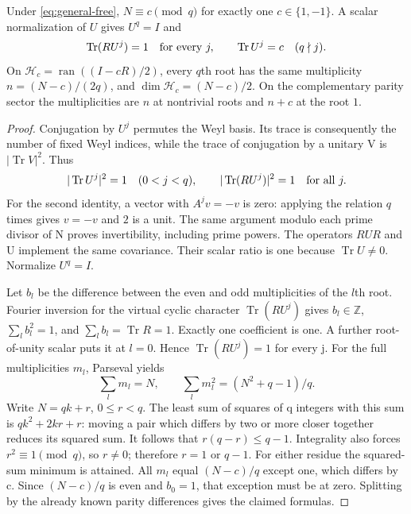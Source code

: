 \begin{theorem}\label{thm:uniform-sector}
Under \eqref{eq:general-free}, $N\equiv c\pmod q$ for exactly one
$c\in\{1,-1\}$. A scalar normalization of $U$ gives $U^q=I$ and
\[
 \operatorname{Tr}(RU^j)=1\quad\hbox{for every }j,\qquad
 \operatorname{Tr}U^j=c\quad(q\nmid j).
\]
On $\mathcal H_c=\operatorname{ran}((I-cR)/2)$, every $q$th root has the same
multiplicity $n=(N-c)/(2q)$, and $\dim\mathcal H_c=(N-c)/2$.
On the complementary parity sector the multiplicities are $n$ at nontrivial
roots and $n+c$ at the root $1$.
\end{theorem}
\begin{proof}
Conjugation by $U^j$ permutes the Weyl basis. Its trace is consequently the
number of fixed Weyl indices, while the trace of conjugation by a unitary V
is $|\operatorname{Tr}V|^2$. Thus
\[
 |\operatorname{Tr}U^j|^2=1\quad(0<j<q),\qquad
 |\operatorname{Tr}(RU^j)|^2=1\quad\hbox{for all }j.
\]
For the second identity, a vector with $A^jv=-v$ is zero: applying the
relation $q$ times gives $v=-v$ and $2$ is a unit. The same argument modulo
each prime divisor of N proves invertibility, including prime powers.
The operators $RUR$ and U implement the same covariance. Their scalar ratio
is one because $\operatorname{Tr}U\ne0$. Normalize $U^q=I$.

Let $b_l$ be the difference between the even and odd multiplicities of the
$l$th root. Fourier inversion for the virtual cyclic character
$\operatorname{Tr}(RU^j)$ gives $b_l\in\mathbb Z$,
$\sum_l b_l^2=1$, and $\sum_l b_l=\operatorname{Tr}R=1$.
Exactly one coefficient is one. A further root-of-unity scalar puts it at
$l=0$. Hence $\operatorname{Tr}(RU^j)=1$ for every j.
For the full multiplicities $m_l$, Parseval yields
\[
 \sum_lm_l=N,\qquad \sum_lm_l^2=(N^2+q-1)/q.
\]
Write $N=qk+r$, $0\leq r<q$. The least sum of squares of q integers with
this sum is $qk^2+2kr+r$: moving a pair which differs by two or more closer
together reduces its squared sum. It follows that $r(q-r)\leq q-1$.
Integrality also forces $r^2\equiv1\pmod q$, so $r\ne0$; therefore
$r=1$ or $q-1$. For either residue the squared-sum minimum is attained.
All $m_l$ equal $(N-c)/q$ except one, which differs by c. Since $(N-c)/q$
is even and $b_0=1$, that exception must be at zero. Splitting by the already
known parity differences gives the claimed formulas.
\end{proof}


